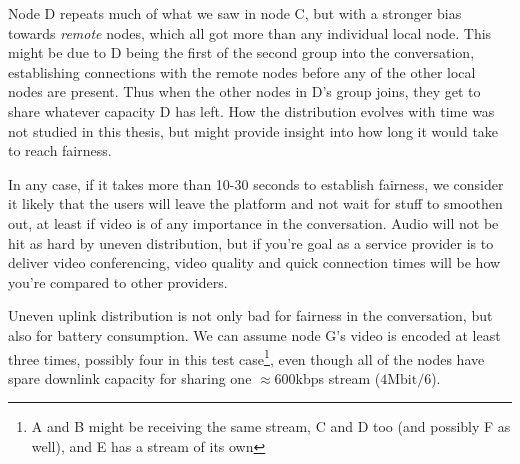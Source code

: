 Node D repeats much of what we saw in node C, but with a stronger bias towards \emph{remote} nodes, which all got more than any individual local node. This might be due to D being the first of the second group into the conversation, establishing connections with the remote nodes before any of the other local nodes are present. Thus when the other nodes in D's group joins, they get to share whatever capacity D has left. How the distribution evolves with time was not studied in this thesis, but might provide insight into how long it would take to reach fairness.

In any case, if it takes more than 10-30 seconds to establish fairness, we consider it likely that the users will leave the platform and not wait for stuff to smoothen out, at least if video is of any importance in the conversation. Audio will not be hit as hard by uneven distribution, but if you're goal as a service provider is to deliver video conferencing, video quality and quick connection times will be how you're compared to other providers.

Uneven uplink distribution is not only bad for fairness in the conversation, but also for battery consumption. We can assume node G's video is encoded at least three times, possibly four in this test case\footnote{A and B might be receiving the same stream, C and D too (and possibly F as well), and E has a stream of its own}, even though all of the nodes have spare downlink capacity for sharing one $\approx$600kbps stream ($4\text{Mbit}/6$).
